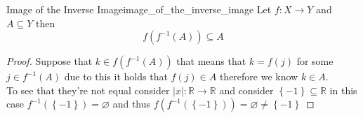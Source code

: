 \begin{proposition}{Image of the Inverse Image}{image_of_the_inverse_image}
Let \( f : X \to Y \) and \( A \subseteq Y \) then 
\[
f\left( f ^{-1} \left( A \right)  \right) \subseteq A
\]
\end{proposition}
\begin{proof}
    Suppose that \(  k \in  f\left( f ^{-1} \left( A \right)  \right)  \) that
    means that \( k =  f\left( j \right)  \) for some \( j \in  f ^{-1} \left( A
    \right)  \) due to this it holds that \( f\left( j \right) \in A \)
    therefore we know \( k \in  A \).\\
    To see that they're not equal consider \( \left| x \right| : \mathbb{R}
    \to \mathbb{R}   \) and consider \( \left\{ - 1 \right\}  \subseteq \mathbb{R}
    \) in this case \( f ^{-1} \left( \left\{ - 1 \right\}   \right) =
    \varnothing   \) and thus \( f\left( f ^{-1} \left( \left\{ - 1 \right\}
    \right)  \right) = \varnothing \neq \left\{ -1 \right\}  \)
\end{proof}

